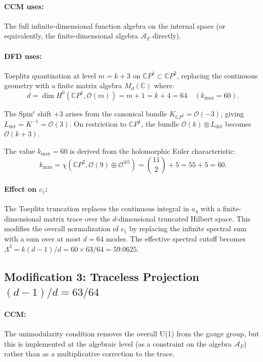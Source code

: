 \documentclass[12pt,a4paper]{article}
\begin{document}
\paragraph{CCM uses:} The full infinite-dimensional function algebra on the
internal space (or equivalently, the finite-dimensional algebra
$\mathcal{A}_F$ directly).

\paragraph{DFD uses:} Toeplitz quantization at level $m = k + 3$ on
$\mathbb{C}P^1 \subset \mathbb{C}P^2$, replacing the continuous geometry
with a finite matrix algebra $M_d(\mathbb{C})$ where:
\begin{equation}
d = \dim H^0(\mathbb{C}P^1, \mathcal{O}(m)) = m + 1 = k + 4 = 64
\quad (k_{\max} = 60).
\end{equation}

The Spin$^c$ shift $+3$ arises from the canonical bundle
$K_{\mathbb{C}P^2} = \mathcal{O}(-3)$, giving
$L_{\det} = K^{-1} = \mathcal{O}(3)$.  On restriction to
$\mathbb{C}P^1$, the bundle $\mathcal{O}(k) \otimes L_{\det}$ becomes
$\mathcal{O}(k+3)$.

The value $k_{\max} = 60$ is derived from the holomorphic Euler
characteristic:
\begin{equation}
k_{\max} = \chi(\mathbb{C}P^2, \mathcal{O}(9) \oplus \mathcal{O}^{\oplus 5})
= \binom{11}{2} + 5 = 55 + 5 = 60.
\end{equation}

\paragraph{Effect on $c_1$:}
The Toeplitz truncation replaces the continuous integral in $a_4$ with a
finite-dimensional matrix trace over the $d$-dimensional truncated Hilbert
space.  This modifies the overall normalization of $c_1$ by replacing the
infinite spectral sum with a sum over at most $d = 64$ modes.  The effective
spectral cutoff becomes $\Lambda^3 = k(d-1)/d = 60 \times 63/64 = 59.0625$.

\subsection{Modification 3: Traceless Projection $(d-1)/d = 63/64$}
\label{sec:mod-traceless}

\paragraph{CCM:} The unimodularity condition removes the overall U(1) from the
gauge group, but this is implemented at the algebraic level (as a constraint
on the algebra $\mathcal{A}_F$) rather than as a multiplicative correction to
the trace.
\end{document}
